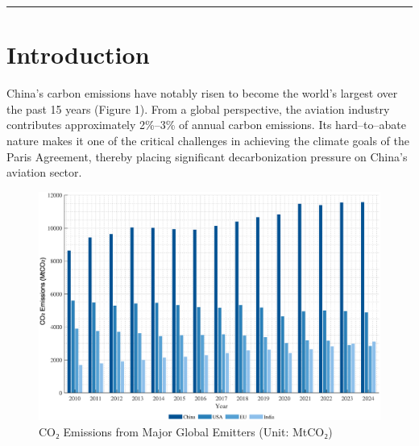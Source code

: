\documentclass[a4paper,11pt]{article}
\begin{document}
\vspace{1em}
\hrule
\vspace{1.5em}



\section{Introduction}
China's carbon emissions have notably risen to become the world's largest over the past 15 years (Figure 1). From a global perspective, the aviation industry contributes approximately 2\%--3\% of annual carbon emissions. Its hard--to--abate nature makes it one of the critical challenges in achieving the climate goals of the Paris Agreement, thereby placing significant decarbonization pressure on China's aviation sector.\\



\begin{figure}[htbp]
    \centering
    \includegraphics[width=0.9\linewidth]{global_co2_emissions.eps}
    \caption{CO₂ Emissions from Major Global Emitters (Unit: MtCO₂)}
    \label{fig:co2_emissions}
\end{figure}
\end{document}
